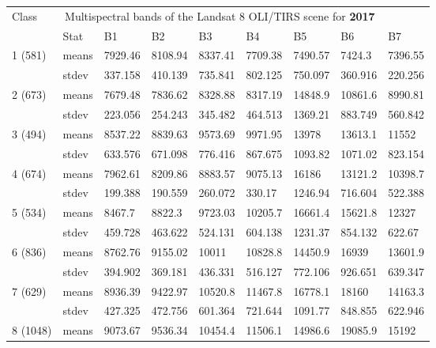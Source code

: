 \documentclass[jmse,article,submit,pdftex,moreauthors]{Definitions/mdpi}
\begin{document}
\begin{table}[H]
  \centering
  \begin{tabularx}{\linewidth}{p{1.3cm}p{1.0cm}p{1.0cm}p{1.0cm}p{1.0cm}p{1.0cm}p{1.0cm}p{1.0cm}p{1.0cm}}
  \toprule
  \multirow{2}{*}{Class} & \multicolumn{7}{c}{Multispectral bands of the Landsat 8 OLI/TIRS scene for \textbf{2017}} \\
    & Stat & B1 & B2 & B3 & B4 & B5 & B6 & B7 \\
    \midrule
    \multirow{2}{*}{1 (581)} & means & 7929.46 & 8108.94 & 8337.41 & 7709.38 & 7490.57 & 7424.3 & 7396.55 \\
    & stdev & 337.158 & 410.139 & 735.841 & 802.125 & 750.097 & 360.916 & 220.256 \\
    \midrule
    \multirow{2}{*}{2 (673)} & means & 7679.48 & 7836.62 & 8328.88 & 8317.19 & 14848.9 & 10861.6 & 8990.81 \\
    & stdev & 223.056 & 254.243 & 345.482 & 464.513 & 1369.21 & 883.749 & 560.842 \\
    \midrule
    \multirow{2}{*}{3 (494)} & means & 8537.22 & 8839.63 & 9573.69 & 9971.95 & 13978 & 13613.1 & 11552 \\
    & stdev & 633.576 & 671.098 & 776.416 & 867.675 & 1093.82 & 1071.02 & 823.154 \\
    \midrule
    \multirow{2}{*}{4 (674)} & means & 7962.61 & 8209.86 & 8883.57 & 9075.13 & 16186 & 13121.2 & 10398.7 \\
    & stdev & 199.388 & 190.559 & 260.072 & 330.17 & 1246.94 & 716.604 & 522.388 \\
    \midrule
    \multirow{2}{*}{5 (534)} & means & 8467.7 & 8822.3 & 9723.03 & 10205.7 &16661.4 & 15621.8 & 12327 \\
    & stdev & 459.728 & 463.622 & 524.131 & 604.138 & 1231.37 & 854.132 & 622.67 \\
    \midrule
    \multirow{2}{*}{6 (836)} & means & 8762.76 & 9155.02 & 10011 & 10828.8 & 14450.9 & 16939 & 13601.9 \\
    & stdev & 394.902 & 369.181 & 436.331 & 516.127 & 772.106 & 926.651 & 639.347 \\
    \midrule
    \multirow{2}{*}{7 (629)} & means & 8936.39 & 9422.97 & 10520.8 & 11467.8 & 16778.1 & 18160 & 14163.3 \\
    & stdev & 427.325 & 472.756 & 601.364 & 721.644 & 1091.77 & 848.855 & 622.946 \\
    \midrule
    \multirow{2}{*}{8 (1048)} & means & 9073.67 & 9536.34 & 10454.4 & 11506.1 & 14986.6 & 19085.9 & 15192 \\

\end{tabularx}
\end{table}
\end{document}
